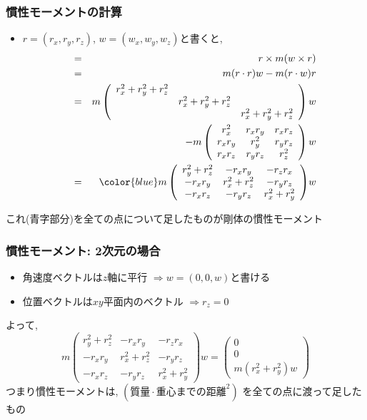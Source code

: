 \documentclass[10pt,dvipdfmx]{beamer}
\newcommand{\ao}[1]{{\color{blue}#1}}
\newcommand{\aka}[1]{{\color{red}#1}}
\begin{document}
\begin{frame}
\frametitle{慣性モーメントの計算}
\begin{itemize}
\item 
$r = (r_x, r_y, r_z)$, $w = (w_x, w_y, w_z)$と書くと,
\begin{eqnarray*}
& = & r \times m (w \times r)  \\
& = & m(r \cdot r) w - m(r \cdot w) r \\
& = & 
m\left(
\begin{array}{ccc}
r_x^2 + r_y^2 + r_z^2 &       & \\
     &  r_x^2 + r_y^2 + r_z^2  & \\
     &       & r_x^2 + r_y^2 + r_z^2 
\end{array}
\right) w \\
&  & 
- 
m\left(
\begin{array}{ccc}
r_x^2   & r_xr_y & r_xr_z \\
r_xr_y  & r_y^2  & r_yr_z \\
r_xr_z  & r_yr_z & r_z^2
\end{array}
\right)w \\
& = &
\ao{m\left(
\begin{array}{ccc}
r_y^2 + r_z^2 & -r_xr_y        & -r_zr_x \\
-r_xr_y      &  r_x^2 + r_z^2  & -r_yr_z \\
-r_xr_z      &  -r_yr_z        & r_x^2 + r_y^2
\end{array}
\right)} w
\end{eqnarray*}
\end{itemize}

これ\ao{(青字部分)}を全ての点について足したものが剛体の慣性モーメント
\end{frame}

\begin{frame}
\frametitle{慣性モーメント: 2次元の場合}
\begin{itemize}
\item 角速度ベクトルは$z$軸に平行 $\Rightarrow w = (0, 0, w)$と書ける
\item 位置ベクトルは$xy$平面内のベクトル $\Rightarrow r_z = 0$
\end{itemize}
よって,
\[
m\left(
\begin{array}{ccc}
r_y^2 + r_z^2 & -r_xr_y        & -r_zr_x \\
-r_xr_y      &  r_x^2 + r_z^2  & -r_yr_z \\
-r_xr_z      &  -r_yr_z        & r_x^2 + r_y^2
\end{array}
\right) w
= 
\left(\begin{array}{c}
0 \\ 0 \\ m(r_x^2 + r_y^2) w
\end{array}\right)
\]
つまり慣性モーメントは, 
\aka{$(\mbox{質量} \cdot \mbox{重心までの距離}^2)$}
を全ての点に渡って足したもの

\end{frame}
\end{document}
